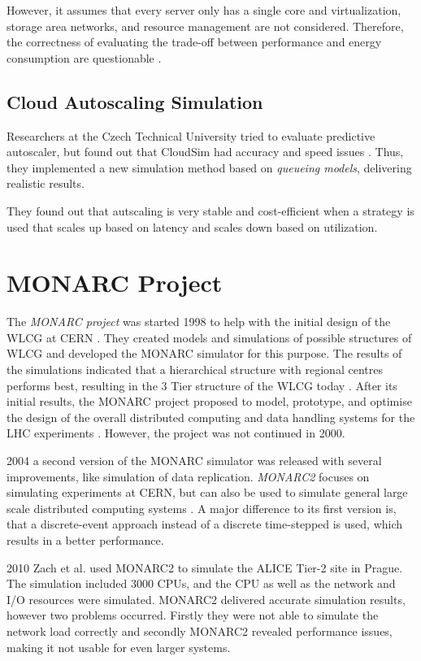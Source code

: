 However, it assumes that every server only has a single core and virtualization, storage area networks, and resource management are not considered. Therefore, the correctness of evaluating the trade-off between performance and energy consumption are questionable \cite{survey_clouds}.

\subsection{Cloud Autoscaling Simulation}
Researchers at the Czech Technical University tried to evaluate predictive autoscaler, but found out that CloudSim had accuracy and speed issues \cite{autoscale_cloud}. Thus, they implemented a new simulation method based on \textit{queueing models}, delivering realistic results. 

They found out that autscaling is very stable and cost-efficient when a strategy is used that scales up based on latency and scales down based on utilization. 

\section{MONARC Project}
The \textit{MONARC project} was started 1998 to help with the initial design of the WLCG at CERN \cite{monarc2000models}. They created models and simulations of possible structures of WLCG and developed the MONARC simulator for this purpose. 
The results of the simulations indicated that a hierarchical structure with regional centres performs best, resulting in the 3 Tier structure of the WLCG today \cite{morita2001validation}. 
After its initial results, the MONARC project proposed to model, prototype, and optimise the design of the overall distributed computing and data handling systems for the LHC experiments \cite{monarc2000models}.
However, the project was not continued in 2000.

2004 a second version of the MONARC simulator was released with several improvements, like simulation of data replication. \textit{MONARC2} focuses on simulating experiments at CERN, but can also be used to simulate general large scale distributed computing systems \cite{legrand2003monarc}. A major difference to its first version is, that a discrete-event approach instead of a discrete time-stepped is used, which results in a better performance.

2010 Zach et al. \cite{1742-6596-331-7-072038} used MONARC2 to simulate the ALICE Tier-2 site in Prague. The simulation included 3000 CPUs, and the CPU as well as the network and I/O resources were simulated. MONARC2 delivered accurate simulation results, however two problems occurred. Firstly they were not able to simulate the network load correctly and secondly MONARC2 revealed performance issues, making it not usable for even larger systems.

